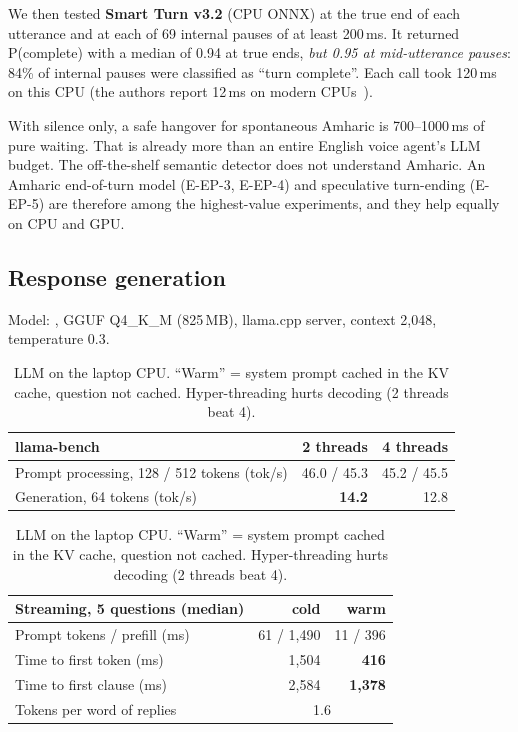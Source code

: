 We then tested \textbf{Smart Turn v3.2} (CPU ONNX) at the true end of each utterance and at each of
69 internal pauses of at least 200\,ms. It returned P(complete) with a median of 0.94 at true ends,
\emph{but 0.95 at mid-utterance pauses}: 84\% of internal pauses were classified as ``turn complete''\meas.
Each call took 120\,ms on this CPU (the authors report 12\,ms on modern CPUs~\cite{smartturn}).

\begin{finding}
With silence only, a safe hangover for spontaneous Amharic is 700--1000\,ms of pure waiting. That is
already more than an entire English voice agent's LLM budget. The off-the-shelf semantic detector does
not understand Amharic. An Amharic end-of-turn model (E-EP-3, E-EP-4) and speculative turn-ending
(E-EP-5) are therefore among the highest-value experiments, and they help equally on CPU and GPU.
\end{finding}

\subsection{Response generation}
\label{sec:m-llm}
Model: , GGUF Q4\_K\_M (825\,MB), llama.cpp server,
context 2{,}048, temperature 0.3.

\begin{table}[H]
\centering\small
\begin{tabular}{@{}lrr@{}}
\toprule
\textbf{llama-bench} & \textbf{2 threads} & \textbf{4 threads} \\
\midrule
Prompt processing, 128 / 512 tokens (tok/s) & 46.0 / 45.3 & 45.2 / 45.5 \\
Generation, 64 tokens (tok/s) & \textbf{14.2} & 12.8 \\
\bottomrule
\end{tabular}

\vspace{6pt}
\begin{tabular}{@{}lrr@{}}
\toprule
\textbf{Streaming, 5 questions (median)} & \textbf{cold} & \textbf{warm} \\
\midrule
Prompt tokens / prefill (ms) & 61 / 1{,}490 & 11 / 396 \\
Time to first token (ms) & 1{,}504 & \textbf{416} \\
Time to first clause (ms) & 2{,}584 & \textbf{1{,}378} \\
Tokens per word of replies & \multicolumn{2}{c}{1.6} \\
\bottomrule
\end{tabular}
\caption{LLM on the laptop CPU\meas. ``Warm'' = system prompt cached in the KV cache, question not
cached. Hyper-threading hurts decoding (2 threads beat 4).}
\label{tab:llm-meas}
\end{table}


